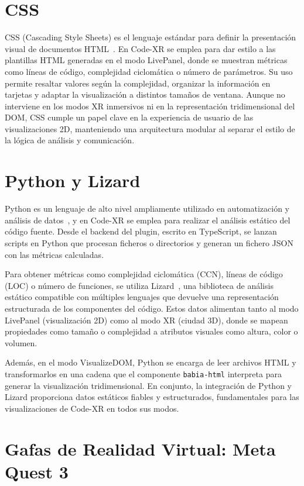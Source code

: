 \documentclass[a4paper, 12pt]{book}
\begin{document}
\section{CSS}
\label{sec:css}

CSS (Cascading Style Sheets) es el lenguaje estándar para definir la presentación visual de documentos HTML~\cite{css}. En Code-XR se emplea para dar estilo a las plantillas HTML generadas en el modo LivePanel, donde se muestran métricas como líneas de código, complejidad ciclomática o número de parámetros. Su uso permite resaltar valores según la complejidad, organizar la información en tarjetas y adaptar la visualización a distintos tamaños de ventana. Aunque no interviene en los modos XR inmersivos ni en la representación tridimensional del DOM, CSS cumple un papel clave en la experiencia de usuario de las visualizaciones 2D, manteniendo una arquitectura modular al separar el estilo de la lógica de análisis y comunicación.

\section{Python y Lizard}
\label{sec:python-lizard}

Python es un lenguaje de alto nivel ampliamente utilizado en automatización y análisis de datos~\cite{python}, y en Code-XR se emplea para realizar el análisis estático del código fuente. Desde el backend del plugin, escrito en TypeScript, se lanzan scripts en Python que procesan ficheros o directorios y generan un fichero JSON con las métricas calculadas.  

Para obtener métricas como complejidad ciclomática (CCN), líneas de código (LOC) o número de funciones, se utiliza Lizard~\cite{lizard}, una biblioteca de análisis estático compatible con múltiples lenguajes que devuelve una representación estructurada de los componentes del código. Estos datos alimentan tanto al modo LivePanel (visualización 2D) como al modo XR (ciudad 3D), donde se mapean propiedades como tamaño o complejidad a atributos visuales como altura, color o volumen.  

Además, en el modo VisualizeDOM, Python se encarga de leer archivos HTML y transformarlos en una cadena que el componente \texttt{babia-html} interpreta para generar la visualización tridimensional. En conjunto, la integración de Python y Lizard proporciona datos estáticos fiables y estructurados, fundamentales para las visualizaciones de Code-XR en todos sus modos.

\section{Gafas de Realidad Virtual: Meta Quest 3}
\label{sec:meta-quest-3}
\end{document}
